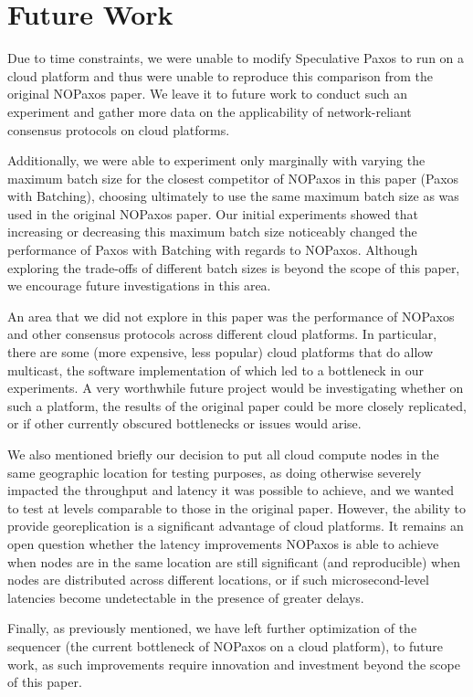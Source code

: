 \section{Future Work}

Due to time constraints, we were unable to modify Speculative Paxos to run on a cloud platform and thus were unable to reproduce this comparison from the original NOPaxos paper. We leave it to future work to conduct such an experiment and gather more data on the applicability of network-reliant consensus protocols on cloud platforms. 

Additionally, we were able to experiment only marginally with varying the maximum batch size for the closest competitor of NOPaxos in this paper (Paxos with Batching), choosing ultimately to use the same maximum batch size as was used in the original NOPaxos paper. Our initial experiments showed that increasing or decreasing this maximum batch size noticeably changed the performance of Paxos with Batching with regards to NOPaxos. Although exploring the trade-offs of different batch sizes is beyond the scope of this paper, we encourage future investigations in this area.  

An area that we did not explore in this paper was the performance of NOPaxos and other consensus protocols across different cloud platforms. In particular, there are some (more expensive, less popular) cloud platforms that do allow multicast, the software implementation of which led to a bottleneck in our experiments. A very worthwhile future project would be investigating whether on such a platform, the results of the original paper could be more closely replicated, or if other currently obscured bottlenecks or issues would arise. 

We also mentioned briefly our decision to put all cloud compute nodes in the same geographic location for testing purposes, as doing otherwise severely impacted the throughput and latency it was possible to achieve, and we wanted to test at levels comparable to those in the original paper. However, the ability to provide georeplication is a significant advantage of cloud platforms. It remains an open question whether the latency improvements NOPaxos is able to achieve when nodes are in the same location are still significant (and reproducible) when nodes are distributed across different locations, or if such microsecond-level latencies become undetectable in the presence of greater delays.

Finally, as previously mentioned, we have left further optimization of the sequencer (the current bottleneck of NOPaxos on a cloud platform), to future work, as such improvements require innovation and investment beyond the scope of this paper. 
